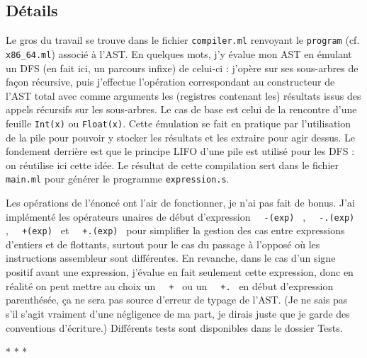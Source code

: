 \documentclass[12pt,french]{article}
\newcommand{\inlinecode}[1]{%
  \texttt{%
    \setlength{\spaceskip}{0.5em plus 1em minus 0.1em}%
    \ifdim\lastskip>0pt \unskip\hspace{0.5em plus 0.5em minus 0.1em}\fi
    #1
  }%
}
\begin{document}
\subsection{Détails}
Le gros du travail se trouve dans le fichier \texttt{compiler.ml} renvoyant le \texttt{program} (cf. \texttt{x86\_64.ml}) associé à l'AST. En quelques mots, j'y évalue mon AST en émulant un DFS (en fait ici, un parcours infixe) de celui-ci : j'opère sur ses sous-arbres de façon récursive, puis j'effectue l'opération correspondant au constructeur de l'AST total avec comme arguments les (registres contenant les) résultats issus des appels récursifs sur les sous-arbres. Le cas de base est celui de la rencontre d'une feuille \texttt{Int(x)} ou \texttt{Float(x)}. Cette émulation se fait en pratique par l'utilisation de la pile pour pouvoir y stocker les résultats et les extraire pour agir dessus. Le fondement derrière est que le principe LIFO d'une pile est utilisé pour les DFS : on réutilise ici cette idée. Le résultat de cette compilation sert dans le fichier \texttt{main.ml} pour générer le programme \texttt{expression.s}. \par
Les opérations de l'énoncé ont l'air de fonctionner, je n'ai pas fait de bonus. J'ai implémenté les opérateurs unaires de début d'expression \inlinecode{-(exp)}, \inlinecode{-.(exp)}, \inlinecode{+(exp)} et \inlinecode{+.(exp)} pour simplifier la gestion des cas entre expressions d'entiers et de flottants, surtout pour le cas du passage à l'opposé où les instructions assembleur sont différentes. En revanche, dans le cas d'un signe positif avant une expression, j'évalue en fait seulement cette expression, donc en réalité on peut mettre au choix un \inlinecode{+} ou un \inlinecode{+.} en début d'expression parenthésée, ça ne sera pas source d'erreur de typage de l'AST. (Je ne sais pas s'il s'agit vraiment d'une négligence de ma part, je dirais juste que je garde des conventions d'écriture.) Différents tests sont disponibles dans le dossier \textsf{Tests}.\newline
\newline
\begin{center}
    *  *  *
\end{center}
\end{document}
